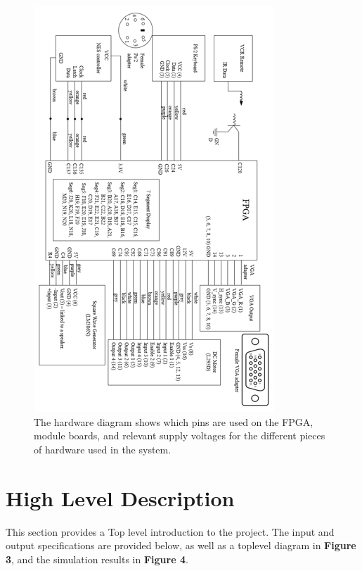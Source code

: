 \documentclass[a4paper]{article}
\begin{document}
\begin{figure}[h]
  \centering
    \includegraphics[width=.8\textwidth]{images/hardware_diagram.png}
	\caption{The hardware diagram shows which pins are used on the FPGA, module boards, and relevant supply voltages for the different pieces of hardware used in the system.}
    \label{fig:hardware}
\end{figure}



\clearpage



\section{High Level Description}
This section provides a Top level introduction to the project. The input and output specifications are provided below, as well as a toplevel diagram in \textbf{Figure 3}, and the simulation results in \textbf{Figure 4}.
\end{document}
